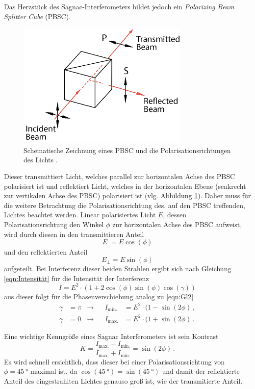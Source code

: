 Das Herzstück des Sagnac-Interferometers bildet jedoch ein \textit{Polarizing Beam Splitter Cube} (PBSC).
\begin{figure}
\includegraphics[width = .3\textwidth]{bilder/sketch-polarizing-cube-beamsplitter.png}
\caption{Schematische Zeichnung eines PBSC und die Polarisationsrichtungen des Lichts \cite{PBSC}.}
\label{fig:PBSC}
\end{figure}
Dieser transmittiert Licht, welches parallel zur horizontalen Achse des PBSC polarisiert ist und reflektiert Licht, welches in der horizontalen Ebene (senkrecht zur vertikalen Achse des PBSC) polarisiert ist (vlg. Abbildung \ref{fig:PBSC}).
Daher muss für die weitere Betrachtung die Polarisationsrichtung des, auf den PBSC treffenden, Lichtes beachtet werden.
Linear polarisiertes Licht $E$, dessen Polarisationsrichtung den Winkel $\phi$ zur horizontalen Achse des PBSC aufweist, wird durch diesen in den transmittieren Anteil
\begin{equation*}
  E_{\_} = E \cos(\phi)
\end{equation*}
und den reflektierten Anteil
\begin{equation*}
  E_{\bot} = E \sin(\phi)
\end{equation*}
aufgeteilt.
\medskip
Bei Interferenz dieser beiden Strahlen ergibt sich nach Gleichung \eqref{eqn:Intensität} für die Intensität der Interferenz
\begin{equation*}
  I = E^2 \cdot (1 + 2 \cos(\phi) \sin(\phi) \cos(\gamma))
\end{equation*}
aus dieser folgt für die Phasenverschiebung analog zu \eqref{eqn:Gl2}
\begin{equation}  \label{eqn:Gl3}
  \begin{aligned}
  \gamma &= \pi &\rightarrow& &I_\text{min.} &= E^2 \cdot (1 − \sin(2\phi) \, , \\
  \gamma &= 0 &\rightarrow& &I_\text{max.} &= E^2 \cdot (1 + \sin(2\phi) \, .
\end{aligned}
\end{equation}

Eine wichtige Kenngröße eines Sagnac Interferometers ist sein Kontrast
\begin{equation}
  K = \frac{I_\text{max.} - I_\text{min.}}{I_\text{max.} + I_\text{min.}} = \sin(2\phi) \, .
  \label{eqn:Kontrast}
\end{equation}
Es wird schnell ersichtlich, dass dieser bei einer Polarisationsrichtung von $\phi = \SI{45}{\degree}$ maximal ist, da $\cos(\SI{45}{\degree}) = \sin(\SI{45}{\degree})$ und damit der reflektierte Anteil des eingestrahlten Lichtes genauso groß ist, wie der transmitierte Anteil.


